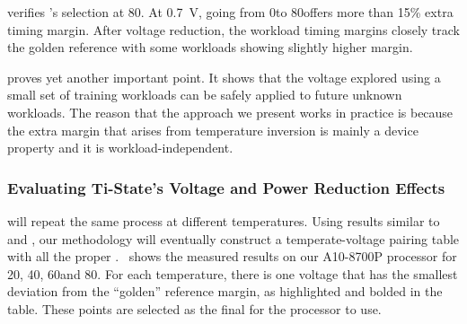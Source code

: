  verifies 's \tistate selection at 80\C. At 0.7~V, going from 0\C to 80\C offers more than 15\% extra timing margin. After voltage reduction, the workload timing margins closely track the golden reference with some workloads showing slightly higher margin.

 proves yet another important point. It shows that the voltage explored using a small set of training workloads can be safely applied to future unknown workloads. The reason that the approach we present works in practice is because the extra margin that arises from temperature inversion is mainly a device property and it is workload-independent.

\subsubsection{Evaluating Ti-State's Voltage and Power Reduction Effects}
\label{sec:temperature:temperature:table}

 will repeat the same process at different temperatures. Using results similar to~ and , our methodology will eventually construct a temperate-voltage pairing table with all the proper \tistates.~ shows the measured results on our A10-8700P processor for 20\C, 40\C, 60\C and 80\C. For each temperature, there is one voltage that has the smallest deviation from the ``golden'' reference margin, as highlighted and bolded in the table. These points are selected as the final \tistates for the processor to use.

